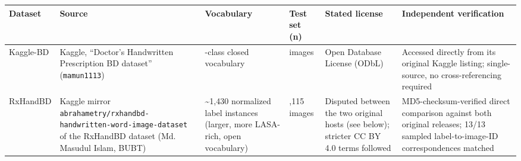 \documentclass[fleqn,10pt]{wlpeerj}
\begin{document}
\begin{small}
\begin{longtable}[]{@{}
  >{\raggedright\arraybackslash}p{}
  >{\raggedright\arraybackslash}p{}
  >{\raggedright\arraybackslash}p{}
  >{\raggedright\arraybackslash}p{}
  >{\raggedright\arraybackslash}p{}
  >{\raggedright\arraybackslash}p{}@{}}
\toprule\noalign{}
\begin{minipage}[b]{\linewidth}\raggedright
Dataset
\end{minipage} & \begin{minipage}[b]{\linewidth}\raggedright
Source
\end{minipage} & \begin{minipage}[b]{\linewidth}\raggedright
Vocabulary
\end{minipage} & \begin{minipage}[b]{\linewidth}\raggedright
Test set (n)
\end{minipage} & \begin{minipage}[b]{\linewidth}\raggedright
Stated license
\end{minipage} & \begin{minipage}[b]{\linewidth}\raggedright
Independent verification
\end{minipage} \\
\midrule\noalign{}
\endhead
\bottomrule\noalign{}
\endlastfoot
Kaggle-BD & Kaggle, ``Doctor's Handwritten Prescription BD dataset'' (\texttt{mamun1113}) & 78-class closed vocabulary & 780 images & Open Database License (ODbL) & Accessed directly from its original Kaggle listing; single-source, no cross-referencing required \\
RxHandBD & Kaggle mirror \texttt{abrahametry/\allowbreak rxhandbd-\allowbreak handwritten-\allowbreak word-\allowbreak image-\allowbreak dataset} of the RxHandBD dataset (Md. Masudul Islam, BUBT) & \textasciitilde1,430 normalized label instances (larger, more LASA-rich, open vocabulary) & 1,115 images & Disputed between the two original hosts (see below); stricter CC BY 4.0 terms followed & MD5-checksum-verified direct comparison against both original releases; 13/13 sampled label-to-image-ID correspondences matched \\
\end{longtable}
\end{small}
\end{document}
